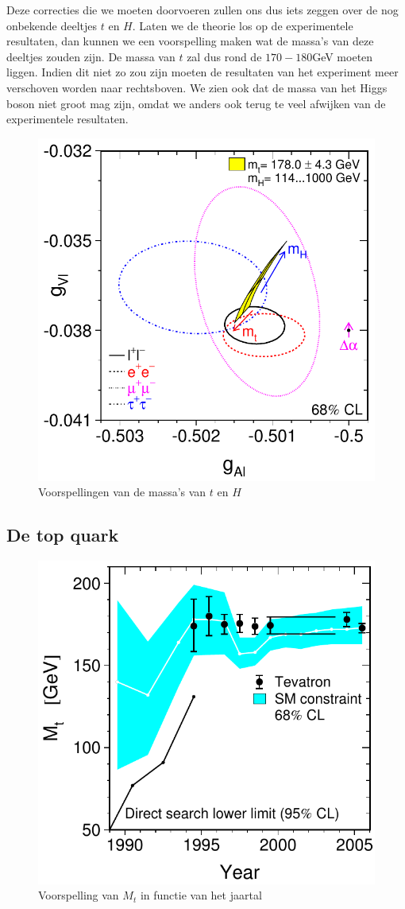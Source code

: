 \documentclass[../main.tex]{subfiles}
\begin{document}
Deze correcties die we moeten doorvoeren zullen ons dus iets zeggen over de nog onbekende deeltjes $t$ en $H$. Laten we de theorie los op de experimentele resultaten, dan kunnen we een voorspelling maken wat de massa's van deze deeltjes zouden zijn. De massa van $t$ zal dus rond de $170-180$GeV moeten liggen. Indien dit niet zo zou zijn moeten de resultaten van het experiment meer verschoven worden naar rechtsboven. We zien ook dat de massa van het Higgs boson niet groot mag zijn, omdat we anders ook terug te veel afwijken van de experimentele resultaten.

\begin{figure}[h]
    \centering
    \includegraphics[width=0.4\linewidth]{elektroweak_precision_tests/massa_t_h_voorspellen.png}
    \caption{Voorspellingen van de massa's van $t$ en $H$}%
    \label{fig:elektroweak_precision_tests/massa_t_h_voorspellen}
\end{figure}

\subsection{De top quark}%
\label{sub:de_top_quark}

\begin{figure}[h]
    \centering
    \includegraphics[width=0.4\linewidth]{elektroweak_precision_tests/t_massa_voorspelling.png}
    \caption{Voorspelling van $M_t$ in functie van het jaartal}%
    \label{fig:elektroweak_precision_tests/t_massa_voorspelling}
\end{figure}
\end{document}
